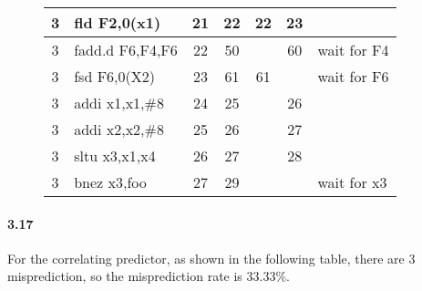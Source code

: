 \documentclass{article}
\begin{document}
\begin{figure}[!ht]
{{\begin{tabular}{c|l|c|c|c|c|p{2.5cm}}
        \hline
        3&fld F2,0(x1)&21&22&22&23& \\
        \hline
        3&fadd.d F6,F4,F6&22&50& &60&wait for F4\\
        \hline
        3&fsd F6,0(X2)&23&61&61&&wait for F6\\
        \hline
        3&addi x1,x1,\#8&24&25& &26& \\
        \hline
        3&addi x2,x2,\#8&25&26& &27& \\
        \hline
        3&sltu x3,x1,x4&26&27& &28& \\
        \hline
        3&bnez x3,foo&27&29& &&wait for x3\\
        \bottomrule
    \end{tabular}
    }
    }
    \end{figure}
    \newpage

\paragraph{3.17} 

For the correlating predictor, as shown in the following table, there are 3 misprediction, so the misprediction rate is 33.33\%.
\begin{figure}[!ht]
    \end{figure}
\end{document}
